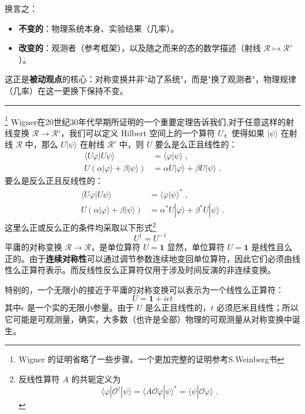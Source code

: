 换言之：
\begin{itemize}
    \item \textbf{不变的}：物理系统本身、实验结果（几率）。
    \item \textbf{改变的}：观测者（参考框架），以及随之而来的态的数学描述（射线 $\mathscr{R}\mapsto\mathscr{R}'$）。
\end{itemize}
这正是\textbf{被动观点}的核心：对称变换并非"动了系统"，而是"换了观测者"，物理规律（几率）在这一更换下保持不变。
\par\vspace{2ex}
    \hrule
\vspace{2ex}
\footnote{Wigner 的证明省略了一些步骤。一个更加完整的证明参考S.Weinberg书}
    Wigner在20世纪30年代早期所证明的一个重要定理告诉我们,对于任意这样的射线变换 $\mathscr{R} \to \mathscr{R}'$，我们可以定义 Hilbert 空间上的一个算符 $U$，使得如果 $|\psi\rangle$ 在射线 $\mathscr{R}$ 中，那么 $U|\psi\rangle$ 在射线 $\mathscr{R}'$ 中，则 $U$ 要么是么正且线性的：
\begin{align}
    \langle U\varphi| U\psi \rangle &= \langle \varphi| \psi \rangle \;, \\
    U(\alpha|\varphi\rangle + \beta|\psi\rangle) &= \alpha U|\varphi\rangle + \beta U|\psi\rangle \;.
\end{align}
要么是反么正且反线性的：
\begin{align}
    \langle U\varphi| U\psi \rangle &= \langle \varphi| \psi \rangle^* \;, \label{eq:anti_unitary_prod}\\
    U(\alpha|\varphi\rangle + \beta|\psi\rangle) &= \alpha^* U|\varphi\rangle + \beta^* U|\psi\rangle \;.
\end{align}
这里么正或反么正的条件均采取以下形式\footnote{反线性算符 $A$ 的共轭定义为
\begin{equation}
    \langle \varphi| \mathscr{O}^\dagger | \psi \rangle = \langle A\mathscr{O}\varphi| \psi \rangle^* = \langle \psi | \mathscr{O}\varphi\rangle \;.
\end{equation}}
\begin{equation}
    U^\dagger = U^{-1} \;.
\end{equation}
 平庸的对称变换 $\mathscr{R} \to \mathscr{R}$，是单位算符 $U=\mathbf{1}$ 显然，单位算符 $U=\mathbf{1}$ 是线性且么正的。由于\textbf{连续对称性}可以通过调节参数连续地变回单位算符，因此它们必须由线性么正算符表示。而反线性反么正算符仅用于涉及时间反演的非连续变换。
\vspace{2ex}\par
 特别的，一个无限小的接近于平庸的对称变换可以表示为一个线性么正算符：$$U = \mathbf{1} + i\epsilon t$$其中$\epsilon$ 是一个实的无限小参量。由于 $U$ 是么正且线性的，$t$ 必须厄米且线性；所以它可能是可观测量，确实，大多数（也许是全部）物理的可观测量从对称变换中诞生。
